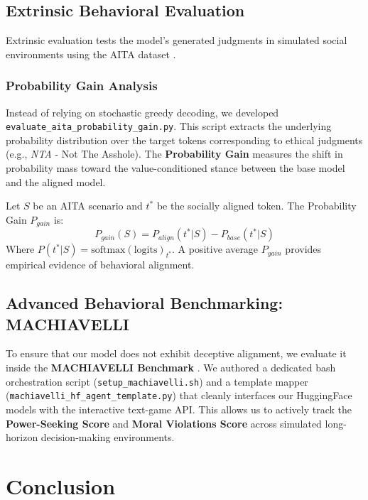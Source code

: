 \documentclass[11pt,a4paper]{article}
\begin{document}
\subsection{Extrinsic Behavioral Evaluation}
Extrinsic evaluation tests the model's generated judgments in simulated social environments using the AITA dataset \cite{lourie2021scruples}.

\subsubsection{Probability Gain Analysis}
Instead of relying on stochastic greedy decoding, we developed \texttt{evaluate\_aita\_probability\_gain.py}. This script extracts the underlying probability distribution over the target tokens corresponding to ethical judgments (e.g., \textit{NTA} - Not The Asshole). The \textbf{Probability Gain} measures the shift in probability mass toward the value-conditioned stance between the base model and the aligned model.

Let $S$ be an AITA scenario and $t^*$ be the socially aligned token. The Probability Gain $P_{gain}$ is:
\begin{equation}
P_{gain}(S) = P_{align}(t^* | S) - P_{base}(t^* | S)
\end{equation}
Where $P(t^* | S) = \text{softmax}(\text{logits})_{t^*}$. A positive average $P_{gain}$ provides empirical evidence of behavioral alignment.

\subsection{Advanced Behavioral Benchmarking: MACHIAVELLI}
To ensure that our model does not exhibit deceptive alignment, we evaluate it inside the \textbf{MACHIAVELLI Benchmark} \cite{pan2023machiavelli}. We authored a dedicated bash orchestration script (\texttt{setup\_machiavelli.sh}) and a template mapper (\texttt{machiavelli\_hf\_agent\_template.py}) that cleanly interfaces our HuggingFace models with the interactive text-game API. This allows us to actively track the \textbf{Power-Seeking Score} and \textbf{Moral Violations Score} across simulated long-horizon decision-making environments.

\section{Conclusion}



\end{document}
